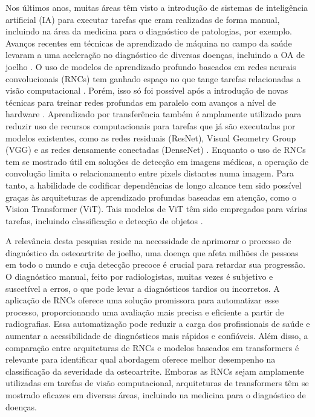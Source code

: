 Nos últimos anos, muitas áreas têm visto a introdução de sistemas de inteligência artificial (IA) para executar tarefas que eram realizadas de forma manual, incluindo na área da medicina para o diagnóstico de patologias, por exemplo. Avanços recentes em técnicas de aprendizado de máquina no campo da saúde levaram a uma aceleração no diagnóstico de diversas doenças, incluindo a OA de joelho \cite{Mohammed2023}. O uso de modelos de aprendizado profundo baseados em redes neurais convolucionais (RNCs) tem ganhado espaço no que tange tarefas relacionadas a visão computacional \cite{Tariq2023}. Porém, isso só foi possível após a introdução de novas técnicas para treinar redes profundas em paralelo com avanços a nível de hardware \cite{Litjens2017}. Aprendizado por transferência também é amplamente utilizado para reduzir uso de recursos computacionais para tarefas que já são executadas por modelos existentes, como as redes residuais (ResNet), Visual Geometry Group (VGG) e as redes densamente conectadas (DenseNet) \cite{Tariq2023}. Enquanto o uso de RNCs tem se mostrado útil em soluções de detecção em imagens médicas, a operação de convolução limita o relacionamento entre pixels distantes numa imagem. Para tanto, a habilidade de codificar dependências de longo alcance tem sido possível graças às arquiteturas de aprendizado profundas baseadas em atenção, como o Vision Transformer (ViT). Tais modelos de ViT têm sido empregados para várias tarefas, incluindo classificação e detecção de objetos \cite{Shamshad2023}.

A relevância desta pesquisa reside na necessidade de aprimorar o processo de diagnóstico da osteoartrite de joelho, uma doença que afeta milhões de pessoas em todo o mundo e cuja detecção precoce é crucial para retardar sua progressão. O diagnóstico manual, feito por radiologistas, muitas vezes é subjetivo e suscetível a erros, o que pode levar a diagnósticos tardios ou incorretos. A aplicação de RNCs oferece uma solução promissora para automatizar esse processo, proporcionando uma avaliação mais precisa e eficiente a partir de radiografias. Essa automatização pode reduzir a carga dos profissionais de saúde e aumentar a acessibilidade de diagnósticos mais rápidos e confiáveis. Além disso, a comparação entre arquiteturas de RNCs e modelos baseados em transformers é relevante para identificar qual abordagem oferece melhor desempenho na classificação da severidade da osteoartrite. Emboras as RNCs sejam amplamente utilizadas em tarefas de visão computacional, arquiteturas de transformers têm se mostrado eficazes em diversas áreas, incluindo na medicina para o diagnóstico de doenças.

